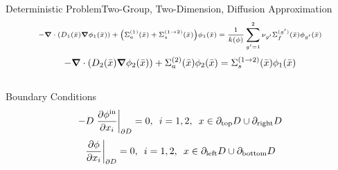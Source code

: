 \documentclass{beamer}
\newcommand{\xs}[2]{\ensuremath{\Sigma_{#1}^{(#2)}}}
\begin{document}
\begin{frame}{Deterministic Problem}{Two-Group, Two-Dimension, Diffusion Approximation}
\vspace{-30pt}
\begin{equation} \scriptsize
-\grad\cdot\qty( D_1(\bar x)\grad\phi_1(\bar x))+\qty(\xs{a}{1}(\bar x)+\xs{s}{1\to2}(\bar x))\phi_1(\bar x) = \frac{1}{k(\phi)}\sum_{g'=1}^2\nu_{g'}\xs{f}{g'}(\bar x)\phi_{g'}(\bar x) \nonumber
\end{equation}
\begin{equation}
-\grad \cdot\qty(D_2(\bar x)\grad \phi_2(\bar x))+\xs{a}{2}(\bar x)\phi_2(\bar x) = \xs{s}{1\to 2}(\bar x)\phi_1(\bar x)\nonumber
\end{equation}\\\vspace{10pt}
Boundary Conditions%
\begin{equation}
-D\eval{\pdv{\phi^{\text{in}}}{x_i}}_{\partial D}=0,\hspace{5pt}i=1,2,\hspace{5pt}
    x\in\partial_\text{top}D\cup\partial_\text{right}D\nonumber
\end{equation}
\begin{equation}
\eval{\pdv{\phi}{x_i}}_{\partial D}=0,\hspace{5pt}i=1,2,\hspace{5pt}
    x\in\partial_\text{left}D\cup\partial_\text{bottom}D\nonumber
\end{equation}
\end{frame}

\end{document}
